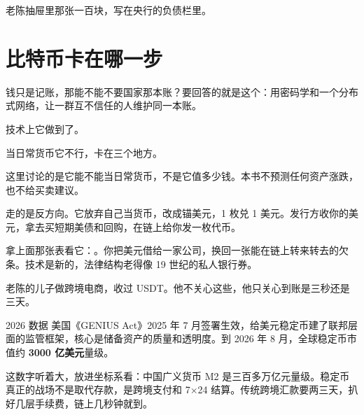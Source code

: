 老陈抽屉里那张一百块，写在央行的负债栏里。

\begin{chainflow}
\chainarrow {}\chainarrow {}\chainarrow {}\chainarrow {}\chainarrow {}
\end{chainflow}

\section{比特币卡在哪一步}

钱只是记账，那能不能不要国家那本账？要回答的就是这个：用密码学和一个分布式网络，让一群互不信任的人维护同一本账。

技术上它做到了。

当日常货币它不行，卡在三个地方。

\begin{flowlist}
\end{flowlist}

这里讨论的是它能不能当日常货币，不是它值多少钱。本书不预测任何资产涨跌，也不给买卖建议。

走的是反方向。它放弃自己当货币，改成锚美元，1 枚兑 1 美元。发行方收你的美元，拿去买短期美债和回购，在链上给你发一枚代币。

拿上面那张表看它：。你把美元借给一家公司，换回一张能在链上转来转去的欠条。技术是新的，法律结构老得像 19 世纪的私人银行券。

老陈的儿子做跨境电商，收过 USDT。他不关心这些，他只关心到账是三秒还是三天。

\begin{databox}{2026 数据}
美国《GENIUS Act》2025 年 7 月签署生效，给美元稳定币建了联邦层面的监管框架，核心是储备资产的质量和透明度。到 2026 年 8 月，全球稳定币市值约 \textbf{3000 亿美元}量级。

这数字听着大，放进坐标系看：中国广义货币 M2 是三百多万亿元量级。稳定币真正的战场不是取代存款，是跨境支付和 7×24 结算。传统跨境汇款要两三天，扒好几层手续费，链上几秒钟就到。

\end{databox}

